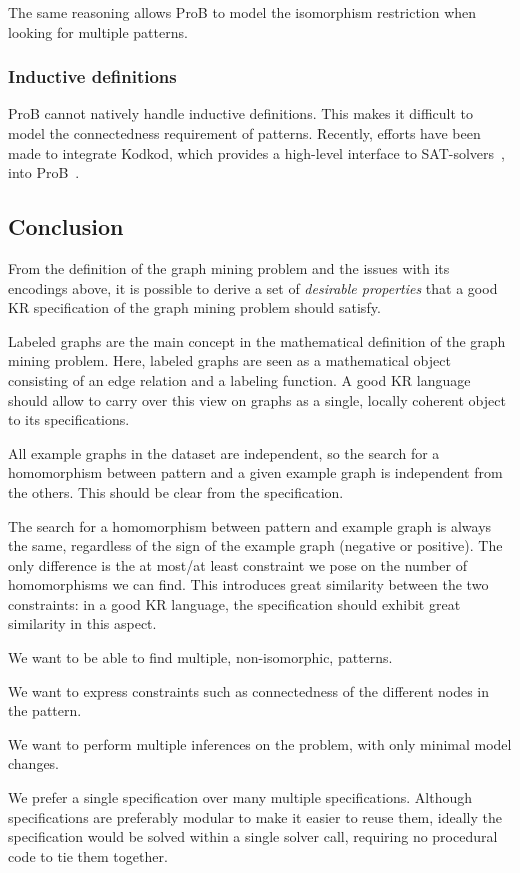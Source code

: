 The same reasoning allows ProB to model the isomorphism restriction when looking for multiple patterns.
\subsubsection{Inductive definitions}
ProB cannot natively handle inductive definitions.
This makes it difficult to model the connectedness requirement of patterns.
Recently, efforts have been made to integrate Kodkod, which provides a high-level interface to SAT-solvers~\citep{DBLP:conf/tacas/TorlakJ07}, into ProB~\citep{DBLP:conf/fm/PlaggeL12}.


\subsection{Conclusion}

From the definition of the graph mining problem and the issues with its encodings above, it is  possible to derive a set of \emph{desirable properties} that a good KR specification of the graph mining problem should satisfy.

\begin{compactitem}
\item Labeled graphs are the main concept in the mathematical definition of the graph mining problem. 
Here, labeled graphs are seen as a mathematical object consisting of an edge relation and a labeling function.
A good KR language should allow to carry over this view on graphs as a single, locally coherent object to its specifications. 
\item All example graphs in the dataset are independent, so the search for a homomorphism between pattern and a given example graph is independent from the others. This should be clear from the specification.
\item The search for a homomorphism between pattern and example graph is always the same, regardless of the sign of the example graph (negative or positive). The only difference is the at most/at least constraint we pose on the number of homomorphisms we can find.
This introduces great similarity between the two constraints: in a good KR language, the specification should exhibit great similarity in this aspect.
\item We want to be able to find multiple, non-isomorphic, patterns.
\item We want to express constraints such as connectedness of the different nodes in the pattern.
\item We want to perform multiple inferences on the problem, with only minimal model changes.
\item We prefer a single specification over many multiple specifications. 
Although specifications are preferably modular to make it easier to reuse them, ideally the specification would be solved within a single solver call, requiring no procedural code to tie them together.
\end{compactitem}

